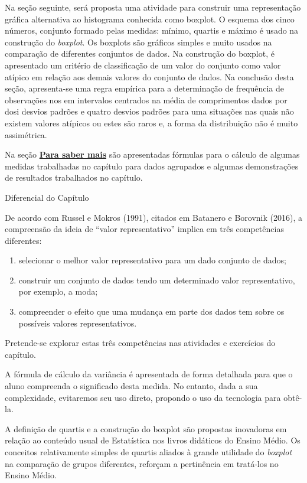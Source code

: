 \begin{apresentacao}
Na seção seguinte, será proposta uma atividade para construir uma representação gráfica alternativa ao histograma conhecida como boxplot. O esquema dos cinco números, conjunto formado pelas medidas: mínimo, quartis e máximo é usado na construção do \textit{boxplot}. Os boxplots são gráficos simples e muito usados na comparação de diferentes conjuntos de dados. Na construção do boxplot, é apresentado um critério de classificação de um valor do conjunto como valor atípico em relação aos demais valores do conjunto de dados. Na conclusão desta seção, apresenta-se uma regra empírica para a determinação de frequência de observações nos em intervalos centrados na média de comprimentos dados por dosi desvios padrões e quatro desvios padrões para uma situações nas quais não existem valores atípicos ou estes são raros e, a forma da distribuição não é muito assimétrica.

Na seção \hyperref[\detokenize{PE104-A:sec-para-saber-mais}]{\textbf{Para saber mais}} são apresentadas fórmulas para o cálculo de algumas medidas trabalhadas no capítulo para dados agrupados e algumas demonstrações de resultados trabalhados no capítulo.

Diferencial do Capítulo

De acordo com Russel e Mokros (1991), citados em Batanero e Borovnik (2016), a compreensão da ideia de “valor representativo”{} implica em três competências diferentes:

\begin{enumerate}
\item selecionar o melhor valor representativo para um dado conjunto de dados;
\item construir um conjunto de dados tendo um determinado valor representativo, por exemplo, a moda;
\item compreender o efeito que uma mudança em parte dos dados tem sobre os possíveis valores representativos.
\end{enumerate}
Pretende-se explorar estas três competências nas atividades e exercícios do capítulo.

A fórmula de cálculo da variância é apresentada de forma detalhada para que o aluno compreenda o significado desta medida. No entanto, dada a sua complexidade, evitaremos seu uso direto, propondo o uso da tecnologia para obtê-la.

A definição de quartis e a construção do boxplot são propostas inovadoras em relação ao conteúdo usual de Estatística nos livros didáticos do Ensino Médio. Os conceitos relativamente simples de quartis aliados à grande utilidade do \textit{boxplot} na comparação de grupos diferentes, reforçam a pertinência em tratá-los no Ensino Médio.


\end{apresentacao}

